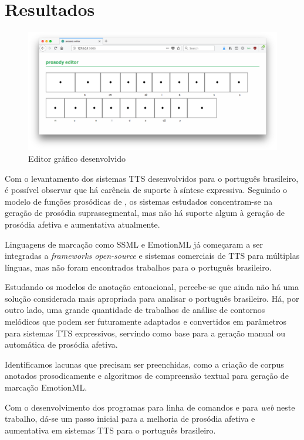 
\chapter{Resultados}
\begin{figure}
  \centering
    \includegraphics[width=1\textwidth]{Imagens/editor.png}
  \caption{Editor gráfico desenvolvido}
  \label{fig:ed}
\end{figure}

Com o levantamento dos sistemas TTS desenvolvidos para o português brasileiro, é
possível observar que há carência de suporte à síntese expressiva. Seguindo o
modelo de funções prosódicas de , os sistemas estudados
concentram-se na geração de prosódia suprassegmental, mas não há suporte algum à
geração de prosódia afetiva e aumentativa atualmente.

Linguagens de marcação como SSML e EmotionML já começaram a ser integradas a
\emph{frameworks open-source} e sistemas comerciais de TTS para múltiplas
línguas, mas não foram encontrados trabalhos para o português brasileiro.

Estudando os modelos de anotação entoacional, percebe-se que ainda não há uma
solução considerada mais apropriada para analisar o português brasileiro. Há,
por outro lado, uma grande quantidade de trabalhos de análise de contornos
melódicos que podem ser futuramente adaptados e convertidos em parâmetros para
sistemas TTS expressivos, servindo como base para a geração manual ou automática
de prosódia afetiva.

Identificamos lacunas que precisam ser preenchidas, como a criação de corpus
anotados prosodicamente e algoritmos de compreensão textual para geração de
marcação EmotionML.

Com o desenvolvimento dos programas para linha de comandos e para \emph{web}
neste trabalho, dá-se um passo inicial para a melhoria de prosódia afetiva e
aumentativa em sistemas TTS para o português brasileiro.

